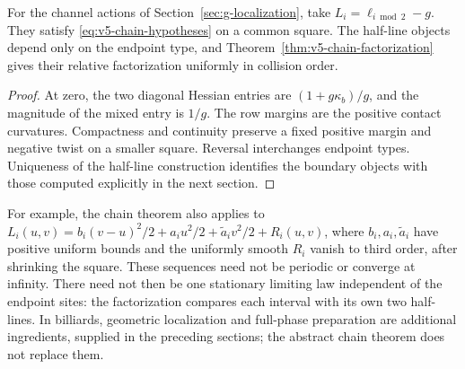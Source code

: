 \begin{corollary}
\label{cor:v5-billiard-chain}
For the channel actions of Section~\ref{sec:g-localization}, take
$L_i=\ell_{i\bmod2}-g$. They satisfy
\eqref{eq:v5-chain-hypotheses} on a common square. The half-line
objects depend only on the endpoint type, and
Theorem~\ref{thm:v5-chain-factorization} gives their relative
factorization uniformly in collision order.
\end{corollary}
\begin{proof}
At zero, the two diagonal Hessian entries are
$(1+g\kappa_b)/g$, and the magnitude of the mixed entry is $1/g$.
The row margins are the positive contact curvatures. Compactness and
continuity preserve a fixed positive margin and negative twist on a
smaller square. Reversal interchanges endpoint types. Uniqueness of
the half-line construction identifies the boundary objects with those
computed explicitly in the next section.
\end{proof}

For example, the chain theorem also applies to
$L_i(u,v)=b_i(v-u)^2/2+a_i u^2/2+\widetilde a_i v^2/2+R_i(u,v)$,
where $b_i,a_i,\widetilde a_i$ have positive uniform bounds and the
uniformly smooth $R_i$ vanish to third order, after shrinking the
square. These sequences need not be periodic or converge at infinity.
There need not then be one stationary limiting law independent of the
endpoint sites: the factorization compares each interval with its own
two half-lines. In billiards, geometric localization and full-phase
preparation are additional ingredients, supplied in the preceding
sections; the abstract chain theorem does not replace them.
